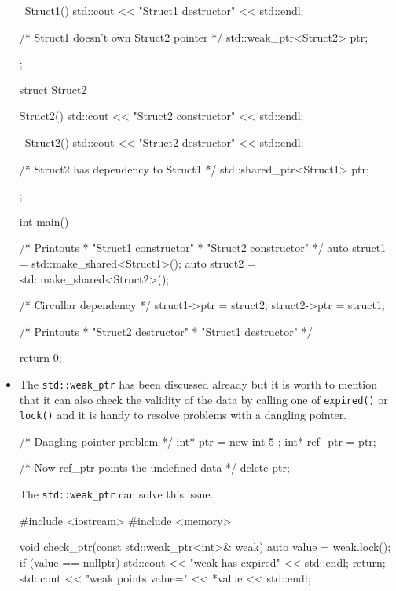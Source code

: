 \documentclass[../main]{subfiles}
\begin{document}
\begin{itemize}
\begin{Code}
{            ~Struct1()
            {
                std::cout << "Struct1 destructor" << std::endl;
            }
            
            /* Struct1 doesn't own Struct2 pointer */
            std::weak_ptr<Struct2> ptr;  
        };
        
        struct Struct2
        {
            Struct2()
            {
                std::cout << "Struct2 constructor" << std::endl;
            }
            
            ~Struct2()
            {
                std::cout << "Struct2 destructor" << std::endl;
            }  
            
            /* Struct2 has dependency to Struct1 */
            std::shared_ptr<Struct1> ptr;
        };
        
        int main()
        {
            {
                /* Printouts
                 * "Struct1 constructor"
                 * "Struct2 constructor"
                 */
                auto struct1 = std::make_shared<Struct1>();
                auto struct2 = std::make_shared<Struct2>();
                
                /* Circullar dependency */
                struct1->ptr = struct2;
                struct2->ptr = struct1;
            }
    
            /* Printouts
             * "Struct2 destructor"
             * "Struct1 destructor"
             */
            
            return 0;
        }
    \end{Code}
    
    \item The \texttt{std::weak\_ptr} has been discussed already
    but it is worth to mention that it can also check the validity
    of the data by calling one of \texttt{expired()} or \texttt{lock()} and it is handy to resolve problems with a dangling pointer.
    
    \begin{Code}
        /* Dangling pointer problem */
        int* ptr = new int { 5 };
        int* ref_ptr = ptr;
        
        /* Now ref_ptr points the undefined data */
        delete ptr;
    \end{Code}
    \noindent
    The \texttt{std::weak\_ptr} can solve this issue.
    \begin{Code}
        #include <iostream>
        #include <memory>
        
        void check_ptr(const std::weak_ptr<int>& weak)
        {
            auto value = weak.lock();
            if (value == nullptr)
            {
                std::cout << "weak has expired" << std::endl;
                return;
            }
            std::cout << "weak points value=" << *value << std::endl;
        }
        

\end{Code}
\end{itemize}
\end{document}
